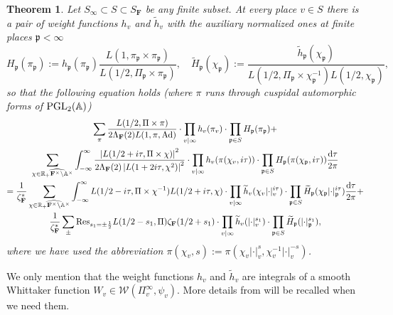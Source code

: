 \documentclass[A4]{amsart}
\newtheorem{theorem}             {Theorem}  [section]
\numberwithin{equation}{section} \everymath{\displaystyle}
\newcommand{\PGL}{{\rm PGL}}
\newcommand{\ud}{\mathrm{d}}
\newcommand{\R}{\mathbb{R}}
\newcommand{\F}{\mathbf{F}}
\newcommand{\A}{\mathbb{A}}
\newcommand{\vp}{\mathfrak{p}}
\newcommand{\norm}[1][\cdot]{\lvert #1 \rvert}
\newcommand{\extnorm}[1]{\left\lvert #1 \right\rvert}
\newcommand{\Res}{{\rm Res}}
\newcommand{\Whi}{\mathcal{W}}
\begin{document}
\begin{theorem}
	Let $S_{\infty} \subset S \subset S_{\F}$ be any finite subset. At every place $v \in S$ there is a pair of weight functions $h_v$ and $\widetilde{h}_v$ with the auxiliary \emph{normalized} ones at finite places $\vp < \infty$
\begin{equation} \label{eq: NWt}
	H_{\vp}(\pi_{\vp}) := h_{\vp}(\pi_{\vp}) \frac{L(1, \pi_{\vp} \times \pi_{\vp})}{L(1/2, \Pi_{\vp} \times \pi_{\vp})}, \quad \widetilde{H}_{\vp}(\chi_{\vp}) := \frac{\widetilde{h}_{\vp}(\chi_{\vp})}{L(1/2, \Pi_{\vp} \times \chi_{\vp}^{-1}) L(1/2, \chi_{\vp})}, 
\end{equation}
	so that the following equation holds (where $\pi$ runs through cuspidal automorphic forms of $\PGL_2(\A)$)
\begin{multline*}
	\sum_{\pi} \frac{L(1/2, \Pi \times \pi)}{2 \Lambda_{\F}(2) L(1,\pi,\mathrm{Ad})} \cdot \prod_{v \mid \infty} h_v(\pi_v) \cdot \prod_{\vp \in S} H_{\vp}(\pi_{\vp}) + \\ 
	\sum_{\chi \in \widehat{\R_+ \F^{\times} \backslash \A^{\times}}} \int_{-\infty}^{\infty} \frac{\extnorm{L(1/2+i\tau, \Pi \times \chi)}^2}{2\Lambda_{\F}(2) \extnorm{L(1+2i\tau,\chi^2)}^2}
	\cdot \prod_{v \mid \infty} h_v(\pi(\chi_v,i\tau)) \cdot \prod_{\vp \in S} H_{\vp}(\pi(\chi_{\vp},i\tau)) \frac{\ud \tau}{2\pi} \\
	= \frac{1}{\zeta_{\F}^*} \sum_{\chi \in \widehat{\R_+ \F^{\times} \backslash \A^{\times}}} \int_{-\infty}^{\infty} L(1/2-i\tau, \Pi \times \chi^{-1}) L(1/2+i\tau, \chi) \cdot \prod_{v \mid \infty} \widetilde{h}_v(\chi_v \norm_v^{i\tau}) \cdot \prod_{\vp \in S} \widetilde{H}_{\vp}(\chi_{\vp} \norm_{\vp}^{i\tau}) \frac{\ud \tau}{2\pi} + \\
	\frac{1}{\zeta_{\F}^*} \sum_{\pm} \Res_{s_1 = \pm \frac{1}{2}} L(1/2-s_1, \Pi) \zeta_{\F}(1/2+s_1) \cdot \prod_{v \mid \infty} \widetilde{h}_v(\norm_v^{s_1}) \cdot \prod_{\vp \in S} \widetilde{H}_{\vp}(\norm_{\vp}^{s_1}),
\end{multline*}
	where we have used the abbreviation $\pi(\chi_v,s) := \pi(\chi_v \norm_v^s, \chi_v^{-1} \norm_v^{-s})$.
\end{theorem}
	
\noindent We only mention that the weight functions $h_v$ and $\widetilde{h}_v$ are integrals of a smooth Whittaker function $W_v \in \Whi(\Pi_v^{\infty}, \psi_v)$. More details from \cite{Wu24+} will be recalled when we need them.
\end{document}
